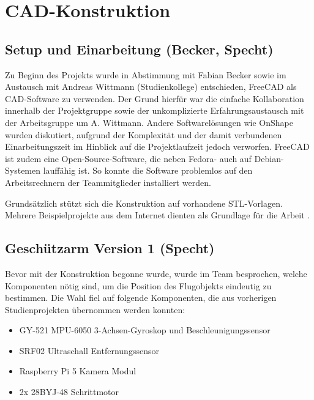 \chapter{CAD-Konstruktion}

\section{Setup und Einarbeitung (Becker, Specht)}

Zu Beginn des Projekts wurde in Abstimmung mit Fabian Becker sowie im Austausch mit Andreas Wittmann (Studienkollege) entschieden, FreeCAD als CAD-Software zu verwenden. Der Grund hierfür war die einfache Kollaboration innerhalb der Projektgruppe sowie der unkomplizierte Erfahrungsaustausch mit der Arbeitsgruppe um A. Wittmann. Andere Softwarelösungen wie OnShape wurden diskutiert, aufgrund der Komplexität und der damit verbundenen Einarbeitungszeit im Hinblick auf die Projektlaufzeit jedoch verworfen. FreeCAD ist zudem eine Open-Source-Software, die neben Fedora- auch auf Debian-Systemen lauffähig ist. So konnte die Software problemlos auf den Arbeitsrechnern der Teammitglieder installiert werden.

Grundsätzlich stützt sich die Konstruktion auf vorhandene STL-Vorlagen. Mehrere Beispielprojekte aus dem Internet dienten als Grundlage für die Arbeit \cite{cad_turret_blueprint,cad_flywheel_blueprint,cad_esp_case_blueprint, cad_gyro_blueprint, cad_servo_v1_blueprint, cad_geometry_srf02}.

\section{Geschützarm Version 1 (Specht) \label{sec:cad_gunarm_v1}}

Bevor mit der Konstruktion begonne wurde, wurde im Team besprochen, welche Komponenten nötig sind, um die Position des Flugobjekts eindeutig zu bestimmen. Die Wahl fiel auf folgende Komponenten, die aus vorherigen Studienprojekten übernommen werden konnten:

\begin{itemize}
    \item GY-521 MPU-6050 3-Achsen-Gyroskop und Beschleunigungssensor
    \item SRF02 Ultraschall Entfernungssensor
    \item Raspberry Pi 5 Kamera Modul
    \item 2x 28BYJ-48 Schrittmotor
\end{itemize}

